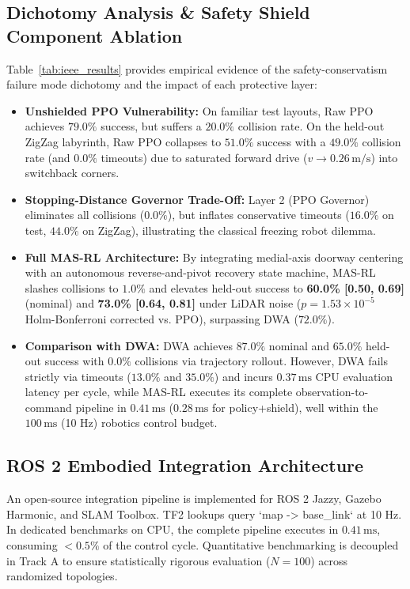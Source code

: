 \documentclass[conference]{IEEEtran}
\begin{document}
\subsection{Dichotomy Analysis \& Safety Shield Component Ablation}
Table~\ref{tab:ieee_results} provides empirical evidence of the safety-conservatism failure mode dichotomy and the impact of each protective layer:
\begin{itemize}
    \item \textbf{Unshielded PPO Vulnerability:} On familiar test layouts, Raw PPO achieves $79.0\%$ success, but suffers a $20.0\%$ collision rate. On the held-out ZigZag labyrinth, Raw PPO collapses to $51.0\%$ success with a $49.0\%$ collision rate (and $0.0\%$ timeouts) due to saturated forward drive ($v \to 0.26\,\text{m/s}$) into switchback corners.
    \item \textbf{Stopping-Distance Governor Trade-Off:} Layer 2 (PPO Governor) eliminates all collisions ($0.0\%$), but inflates conservative timeouts ($16.0\%$ on test, $44.0\%$ on ZigZag), illustrating the classical freezing robot dilemma.
    \item \textbf{Full MAS-RL Architecture:} By integrating medial-axis doorway centering with an autonomous reverse-and-pivot recovery state machine, MAS-RL slashes collisions to $1.0\%$ and elevates held-out success to \textbf{60.0\% [0.50, 0.69]} (nominal) and \textbf{73.0\% [0.64, 0.81]} under LiDAR noise ($p = 1.53 \times 10^{-5}$ Holm-Bonferroni corrected vs. PPO), surpassing DWA ($72.0\%$).
    \item \textbf{Comparison with DWA:} DWA achieves $87.0\%$ nominal and $65.0\%$ held-out success with $0.0\%$ collisions via trajectory rollout. However, DWA fails strictly via timeouts ($13.0\%$ and $35.0\%$) and incurs $0.37\,\text{ms}$ CPU evaluation latency per cycle, while MAS-RL executes its complete observation-to-command pipeline in $0.41\,\text{ms}$ ($0.28\,\text{ms}$ for policy+shield), well within the $100\,\text{ms}$ (10 Hz) robotics control budget.
\end{itemize}

\subsection{ROS 2 Embodied Integration Architecture}
An open-source integration pipeline is implemented for ROS 2 Jazzy, Gazebo Harmonic, and SLAM Toolbox. TF2 lookups query `map -> base_link` at 10 Hz. In dedicated benchmarks on CPU, the complete pipeline executes in \textbf{$0.41\,\text{ms}$}, consuming $< 0.5\%$ of the control cycle. Quantitative benchmarking is decoupled in Track A to ensure statistically rigorous evaluation ($N=100$) across randomized topologies.
\end{document}
